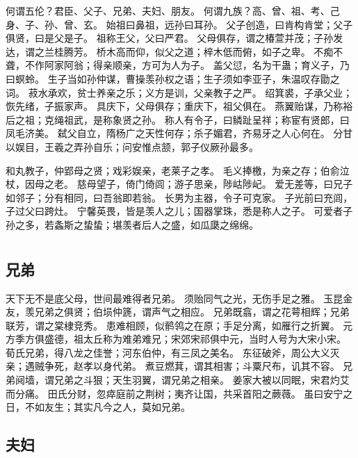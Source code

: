 \documentclass[12pt,UTF8]{ctexbook}
\begin{document}
何谓五伦？君臣、父子、兄弟、夫妇、朋友。
何谓九族？高、曾、祖、考、己身、子、孙、曾、玄。
始祖曰鼻祖，远孙曰耳孙。
父子创造，曰肯构肯堂；父子俱贤，曰是父是子。
祖称王父，父曰严君。
父母俱存，谓之椿萱并茂；子孙发达，谓之兰桂腾芳。
桥木高而仰，似父之道；梓木低而俯，如子之卑。
不痴不聋，不作阿家阿翁；得亲顺亲，方可为人为子。
盖父愆，名为干蛊；育义子，乃曰螟蛉。
生子当如孙仲谋，曹操羡孙权之语；生子须如李亚子，朱温叹存勖之词。
菽水承欢，贫士养亲之乐；义方是训，父亲教子之严。
绍箕裘，子承父业；恢先绪，子振家声。
具庆下，父母俱存；重庆下，祖父俱在。
燕翼贻谋，乃称裕后之祖；克绳祖武，是称象贤之孙。
称人有令子，曰鳞趾呈祥；称宦有贤郎，曰凤毛济美。
弑父自立，隋杨广之天性何存；杀子媚君，齐易牙之人心何在。
分甘以娱目，王羲之弄孙自乐；问安惟点颔，郭子仪厥孙最多。

和丸教子，仲郢母之贤；戏彩娱亲，老莱子之孝。
毛义捧檄，为亲之存；伯俞泣杖，因母之老。
慈母望子，倚门倚闾；游子思亲，陟岵陟屺。
爱无差等，曰兄子如邻子；分有相同，曰吾翁即若翁。
长男为主器，令子可克家。
子光前曰充闾，子过父曰跨灶。
宁馨英畏，皆是羡人之儿；国器掌珠，悉是称人之子。
可爱者子孙之多，若螽斯之蛰蛰；堪羡者后人之盛，如瓜瓞之绵绵。

\part{}

\chapter{兄弟}

天下无不是底父母，世间最难得者兄弟。
须贻同气之光，无伤手足之雅。
玉昆金友，羡兄弟之俱贤；伯埙仲篪，谓声气之相应。
兄弟既翕，谓之花萼相辉；兄弟联芳，谓之棠棣竞秀。
患难相顾，似鹡鸰之在原；手足分离，如雁行之折翼。
元方季方俱盛德，祖太丘称为难弟难兄；宋郊宋祁俱中元，当时人号为大宋小宋。
荀氏兄弟，得八龙之佳誉；河东伯仲，有三凤之美名。
东征破斧，周公大义灭亲；遇贼争死，赵孝以身代弟。
煮豆燃萁，谓其相害；斗粟尺布，讥其不容。
兄弟阋墙，谓兄弟之斗狠；天生羽翼，谓兄弟之相亲。
姜家大被以同眠，宋君灼艾而分痛。
田氏分财，忽瘁庭前之荆树；夷齐让国，共采首阳之蕨薇。
虽曰安宁之日，不如友生；其实凡今之人，莫如兄弟。

\chapter{夫妇}
\end{document}
